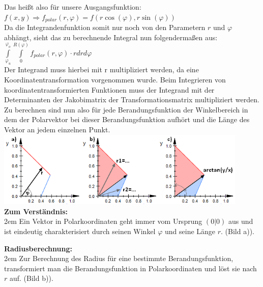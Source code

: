 \documentclass[11pt,final]{scrreprt}
\begin{document}
Das heißt also für unsere Ausgangsfunktion:\\

$ f(x, y) \Rightarrow f_{polar}(r, \varphi) = f(r\cos(\varphi), r\sin(\varphi)) $\\

Da die Integrandenfunktion somit nur noch von den Parametern $r$ und $\varphi$ abhängt, sieht das zu berechnende Integral nun folgendermaßen aus:\\

$\int\limits_{\varphi_u}^{\varphi_o} \int\limits_{0}^{R(\varphi)} f_{polar}(r, \varphi) \cdot r dr d\varphi$\\

Der Integrand muss hierbei mit r multipliziert werden, da eine Koordinatentransformation vorgenommen wurde. Beim Integrieren von koordinatentransformierten Funktionen muss der Integrand mit der Determinanten der Jakobimatrix der Transformationsmatrix multipliziert werden.\\

Zu berechnen sind nun also für jede Berandungsfunktion der Winkelbereich in dem der Polarvektor bei dieser Berandungsfunktion aufhört und die Länge des Vektor an jedem einzelnen Punkt.\\

\includegraphics[width=12cm]{images/flaechenintegral/polarkoordinaten.png}\\

\textbf{Zum Verständnis:} \\

\begingroup
\leftskip2em 
Ein Vektor in Polarkoordinaten geht immer vom Ursprung $(0|0)$ aus und ist eindeutig charakterisiert durch seinen Winkel $\varphi$ und seine Länge $r$. (Bild a)).\\
\par	
\endgroup

\textbf{Radiusberechnung:}\\

\begingroup
\leftskip2em 
Zur Berechnung des Radius für eine bestimmte Berandungsfunktion, transformiert man die Berandungsfunktion in Polarkoordinaten und löst sie nach $r$ auf. (Bild b)).\\
\par	
\endgroup
\end{document}
